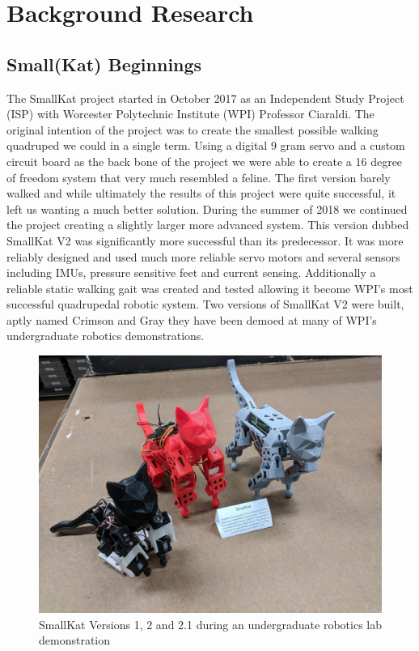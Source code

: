 \graphicspath{ {./figures/} }
\section{Background Research}
\label{chap:background}
\subsection{Small(Kat) Beginnings}
 The SmallKat project started in October 2017 as an Independent Study Project (ISP) with Worcester Polytechnic Institute (WPI) Professor Ciaraldi. The original intention of the project was to create the smallest possible walking quadruped we could in a single term. Using a digital 9 gram servo and a custom circuit board as the back bone of the project we were able to create a 16 degree of freedom system that very much resembled a feline. The first version barely walked and while ultimately the results of this project were quite successful, it left us wanting a much better solution. During the summer of 2018 we continued the project creating a slightly larger more advanced system. This version dubbed SmallKat V2 was significantly more successful than its predecessor. It was more reliably designed and used much more reliable servo motors and several sensors including IMUs, pressure sensitive feet and current sensing. Additionally a reliable static walking gait was created and tested allowing it become WPI's most successful quadrupedal robotic system. Two versions of SmallKat V2 were built, aptly named Crimson and Gray they have been demoed at many of WPI's undergraduate robotics demonstrations. 
 
     \begin{figure}[H]
        \centering
        \includegraphics[width=120mm]{figures/V1andV2.jpg}
        \caption{SmallKat Versions 1, 2 and 2.1 during an undergraduate robotics lab demonstration}
        \label{fig:my_label}
    \end{figure}
